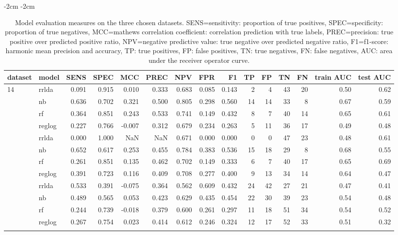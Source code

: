 \begin{table}[htpb]
\addtolength{\leftskip} {-2cm} %
\addtolength{\rightskip} {-2cm} %
\begin{tabular}{llrrrrrrrrrrrrr}
\toprule{}
dataset &model & SENS & SPEC & MCC & PREC & NPV & FPR & F1 & TP & FP & TN & FN & train AUC & test AUC\\
\midrule{}
14    & rrlda & 0.091 & 0.915 & 0.010 & 0.333 & 0.683 & 0.085 & 0.143 & 2 & 4 & 43 & 20 & 0.50 & 0.62\\
    & nb & 0.636 & 0.702 & 0.321 & 0.500 & 0.805 & 0.298 & 0.560 & 14 & 14 & 33 & 8 & 0.67 & 0.59\\
    & rf & 0.364 & 0.851 & 0.243 & 0.533 & 0.741 & 0.149 & 0.432 & 8 & 7 & 40 & 14 & 0.65 & 0.61\\
    & reglog & 0.227 & 0.766 & -0.007 & 0.312 & 0.679 & 0.234 & 0.263 & 5 & 11 & 36 & 17 & 0.49 & 0.48\\
\addlinespace
16    & rrlda & 0.000 & 1.000 & NaN & NaN & 0.671 & 0.000 & 0.000 & 0 & 0 & 47 & 23 & 0.48 & 0.61\\
    & nb & 0.652 & 0.617 & 0.253 & 0.455 & 0.784 & 0.383 & 0.536 & 15 & 18 & 29 & 8 & 0.68 & 0.55\\
    & rf & 0.261 & 0.851 & 0.135 & 0.462 & 0.702 & 0.149 & 0.333 & 6 & 7 & 40 & 17 & 0.65 & 0.69\\
    & reglog & 0.391 & 0.723 & 0.116 & 0.409 & 0.708 & 0.277 & 0.400 & 9 & 13 & 34 & 14 & 0.64 & 0.47\\
\addlinespace
19    & rrlda & 0.533 & 0.391 & -0.075 & 0.364 & 0.562 & 0.609 & 0.432 & 24 & 42 & 27 & 21 & 0.47 & 0.41\\
    & nb & 0.489 & 0.565 & 0.053 & 0.423 & 0.629 & 0.435 & 0.454 & 22 & 30 & 39 & 23 & 0.54 & 0.48\\
    & rf & 0.244 & 0.739 & -0.018 & 0.379 & 0.600 & 0.261 & 0.297 & 11 & 18 & 51 & 34 & 0.54 & 0.52\\
    & reglog & 0.267 & 0.754 & 0.023 & 0.414 & 0.612 & 0.246 & 0.324 & 12 & 17 & 52 & 33 & 0.51 & 0.32\\
\bottomrule{}
\end{tabular}
\caption{Model evaluation measures on the three chosen datasets.
    SENS=sensitivity: proportion of true positives, SPEC=specificity:
    proportion of true negatives, MCC=mathews correlation coefficient:
    correlation prediction with true labels, PREC=precision: true positive over
    predicted positive ratio, NPV=negative predictive value: true negative over
    predicted negative ratio, F1=f1-score: harmonic mean precision and
    accuracy, TP: true positives, FP: false positives, TN: true negatives, FN:
    false negatives, AUC: area under the receiver operator curve.}\label{tbl:modelEval}
\end{table}

